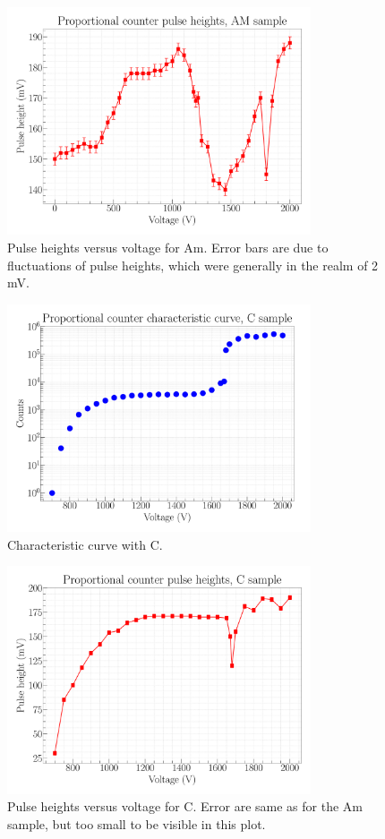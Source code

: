 \begin{figure}[H]
\centering
\includegraphics[width=0.8\textwidth]{../Figures/Proportional_pulse_heights_AM.pdf}
\caption{Pulse heights versus voltage for Am. Error bars are due to fluctuations of pulse heights, which were generally in the realm of 2 mV.}
\label{fig:AmPH}
\end{figure}

\begin{figure}[H]
\centering
\includegraphics[width=0.8\textwidth]{../Figures/Proportional_characteristic_curve_C.pdf}
\caption{Characteristic curve with C.}
\label{fig:CChar}
\end{figure}

\begin{figure}[H]
\centering
\includegraphics[width=0.8\textwidth]{../Figures/Proportional_pulse_heights_C.pdf}
\caption{Pulse heights versus voltage for C. Error are same as for the Am sample, but too small to be visible in this plot.}
\label{fig:CPH}
\end{figure}


